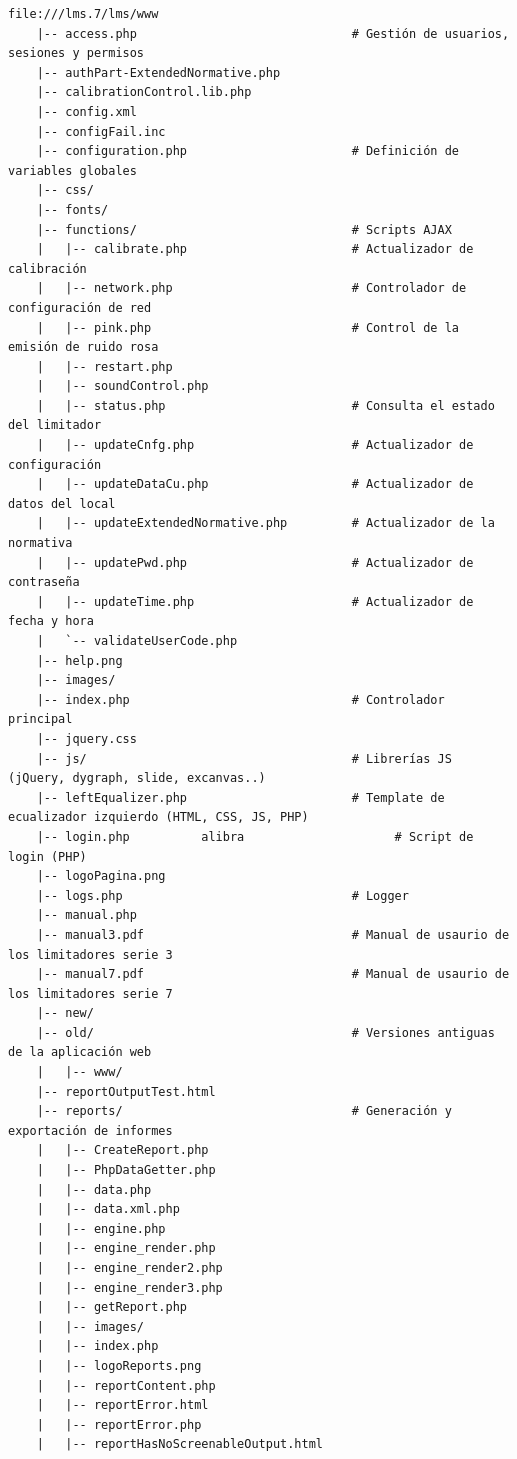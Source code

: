 \begin{lstlisting}[label={lst:lm7-www-treeview}, caption={Estructura de directorios y ficheros de la interfaz web}]
    file:///lms.7/lms/www
    |-- access.php                              # Gestión de usuarios, sesiones y permisos
    |-- authPart-ExtendedNormative.php
    |-- calibrationControl.lib.php
    |-- config.xml
    |-- configFail.inc
    |-- configuration.php                       # Definición de variables globales
    |-- css/
    |-- fonts/
    |-- functions/                              # Scripts AJAX
    |   |-- calibrate.php                       # Actualizador de calibración
    |   |-- network.php                         # Controlador de configuración de red
    |   |-- pink.php                            # Control de la emisión de ruido rosa
    |   |-- restart.php
    |   |-- soundControl.php
    |   |-- status.php                          # Consulta el estado del limitador
    |   |-- updateCnfg.php                      # Actualizador de configuración
    |   |-- updateDataCu.php                    # Actualizador de datos del local
    |   |-- updateExtendedNormative.php         # Actualizador de la normativa
    |   |-- updatePwd.php                       # Actualizador de contraseña
    |   |-- updateTime.php                      # Actualizador de fecha y hora
    |   `-- validateUserCode.php
    |-- help.png
    |-- images/
    |-- index.php                               # Controlador principal
    |-- jquery.css
    |-- js/                                     # Librerías JS (jQuery, dygraph, slide, excanvas..)
    |-- leftEqualizer.php                       # Template de ecualizador izquierdo (HTML, CSS, JS, PHP)
    |-- login.php          alibra                     # Script de login (PHP)
    |-- logoPagina.png
    |-- logs.php                                # Logger
    |-- manual.php
    |-- manual3.pdf                             # Manual de usaurio de los limitadores serie 3
    |-- manual7.pdf                             # Manual de usaurio de los limitadores serie 7
    |-- new/
    |-- old/                                    # Versiones antiguas de la aplicación web
    |   |-- www/
    |-- reportOutputTest.html
    |-- reports/                                # Generación y exportación de informes
    |   |-- CreateReport.php
    |   |-- PhpDataGetter.php
    |   |-- data.php
    |   |-- data.xml.php
    |   |-- engine.php
    |   |-- engine_render.php
    |   |-- engine_render2.php
    |   |-- engine_render3.php
    |   |-- getReport.php
    |   |-- images/
    |   |-- index.php
    |   |-- logoReports.png
    |   |-- reportContent.php
    |   |-- reportError.html
    |   |-- reportError.php
    |   |-- reportHasNoScreenableOutput.html

\end{lstlisting}
